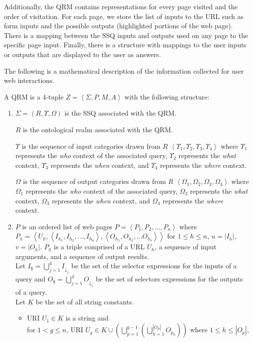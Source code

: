 Additionally, the QRM contains representations for every page visited
and the order of visitation.  For each page, we store the list of
inputs to the URL such as form inputs and the possible outputs
(highlighted portions of the web page).  There is a mapping between the
SSQ inputs and outputs used on any page to the specific page input.
Finally, there is a structure with mappings to the user inputs or
outputs that are displayed to the user as answers.

The following is a mathematical description of the information
collected for user web interactions.

A QRM is a 4-tuple $Z = \left< \Sigma, P, M, A
\right>$ with the following structure:

\begin{enumerate}

\item $\Sigma = ( R, \Upsilon, \Omega )$ is the SSQ associated with the QRM.

  $R$ is the ontological realm associated with the QRM. 

  $\Upsilon$ is the sequence of input categories drawn from $R$
  $\left< \Upsilon_{1}, \Upsilon_{2}, \Upsilon_{3}, \Upsilon_{4}
  \right>$ where $\Upsilon_{1}$ represents the \emph{who} context of
  the associated query, $\Upsilon_{2}$ represents the \emph{what}
  context, $\Upsilon_{3}$ represents the \emph{when} context, and
  $\Upsilon_{4}$ represents the \emph{where} context.

  $\Omega$ is the sequence of output categories drawn from $R$
  $\left<\Omega_{1}, \Omega_{2}, \Omega_{3}, \Omega_{4}\right>$ where
  $\Omega_{1}$ represents the \emph{who} context of the associated
  query, $\Omega_{2}$ represents the \emph{what} context, $\Omega_{3}$
  represents the \emph{when} context, and $\Omega_{4}$ represents the
  \emph{where} context.

\item $P$ is an ordered list of web pages $P = \left<P_1,P_2,...,
  P_n\right>$ where $P_h =
  \left<U_h,\left<I_{h_1},I_{h_2},...,I_{h_u}\right>,\left<O_{h_1},O_{h_2},...O_{h_v}\right>\right>$
  for $1 \leq h \leq n$, $u = \left| I_h \right|$, $v = \left| O_h
  \right|$. $P_h$ is a triple comprised of a URL $U_h$, a sequence of
  input arguments, and a sequence of output results.  \\ Let $I_{\$} =
  \bigcup_{j=1}^{4} I_{\downarrow_j}$ be the set of the selector
  expressions for the inputs of a query and $O_{\$} =
  \bigcup_{j=1}^{4} O_{\downarrow_j}$ be the set of selectors
  expressions for the outputs of a query.  \\ Let $K$ be the set of
  all string constants.
\begin{itemize}
\item URI $U_1 \in K$ is a string and \\ for $1 < g \leq n$, URI $U_g
  \in K \cup \left( \bigcup^{g-1}_{p=1} \left(
  \bigcup^{\left|O_p\right|}_{h=1}O_{p_h} \right)\right)$ where $1
  \leq h \leq \left| O_p \right| $,


\end{itemize}
\end{enumerate}
